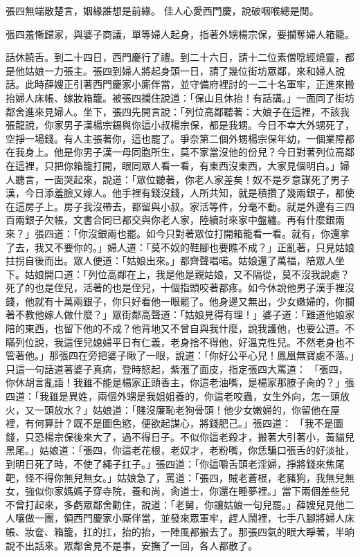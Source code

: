 \begin{showcontents}{}
張四無端散楚言，姻緣誰想是前緣。
佳人心愛西門慶，說破咽喉總是閒。

張四羞慚歸家，與婆子商議，單等婦人起身，指著外甥楊宗保，要攔奪婦人箱籠。

話休饒舌。到二十四日，西門慶行了禮。到二十六日，請十二位素僧唸經燒靈，都是他姑娘一力張主。張四到婦人將起身頭一日，請了幾位街坊眾鄰，來和婦人說話。此時薛嫂正引著西門慶家小廝伴當，並守備府裡討的一二十名軍牢，正進來搬抬婦人床帳、嫁妝箱籠。被張四攔住說道：「保山且休抬！有話講。」一面同了街坊鄰舍進來見婦人。坐下，張四先開言說：「列位高鄰聽著：大娘子在這裡，不該我張龍說，你家男子漢楊宗錫與你這小叔楊宗保，都是我甥。今日不幸大外甥死了，空掙一場錢。有人主張著你，這也罷了。爭奈第二個外甥楊宗保年幼，一個業障都在我身上。他是你男子漢一母同胞所生，莫不家當沒他的份兒？今日對著列位高鄰在這裡，只把你箱籠打開，眼同眾人看一看，有東西沒東西，大家見個明白。」婦人聽言，一面哭起來，說道：「眾位聽著，你老人家差矣！奴不是歹意謀死了男子漢，今日添羞臉又嫁人。他手裡有錢沒錢，人所共知，就是積攢了幾兩銀子，都使在這房子上。房子我沒帶去，都留與小叔。家活等件，分毫不動。就是外邊有三四百兩銀子欠帳，文書合同已都交與你老人家，陸續討來家中盤纏。再有什麼銀兩來？」張四道：「你沒銀兩也罷。如今只對著眾位打開箱籠看一看。就有，你還拿了去，我又不要你的。」婦人道：「莫不奴的鞋腳也要瞧不成？」正亂著，只見姑娘拄拐自後而出。眾人便道：「姑娘出來。」都齊聲唱喏。姑娘還了萬福，陪眾人坐下。姑娘開口道：「列位高鄰在上，我是他是親姑娘，又不隔從，莫不沒我說處？死了的也是侄兒，活著的也是侄兒，十個指頭咬著都疼。如今休說他男子漢手裡沒錢，他就有十萬兩銀子，你只好看他一眼罷了。他身邊又無出，少女嫩婦的，你攔著不教他嫁人做什麼？」眾街鄰高聲道：「姑娘見得有理！」婆子道：「難道他娘家陪的東西，也留下他的不成？他背地又不曾自與我什麼，說我護他，也要公道。不瞞列位說，我這侄兒媳婦平日有仁義，老身捨不得他，好溫克性兒。不然老身也不管著他。」那張四在旁把婆子瞅了一眼，說道：「你好公平心兒！鳳凰無寶處不落。」只這一句話道著婆子真病，登時怒起，紫漲了面皮，指定張四大罵道： 「張四，你休胡言亂語！我雖不能是楊家正頭香主，你這老油嘴，是楊家那膫子肏的？」張四道：「我雖是異姓，兩個外甥是我姐姐養的，你這老咬蟲，女生外向，怎一頭放火，又一頭放水？」姑娘道：「賤沒廉恥老狗骨頭！他少女嫩婦的，你留他在屋裡，有何算計？既不是圖色慾，便欲起謀心，將錢肥己。」張四道： 「我不是圖錢，只恐楊宗保後來大了，過不得日子。不似你這老殺才，搬著大引著小，黃貓兒黑尾。」姑娘道：「張四，你這老花根，老奴才，老粉嘴，你恁騙口張舌的好淡扯，到明日死了時，不使了繩子扛子。」張四道：「你這嚼舌頭老淫婦，掙將錢來焦尾靶，怪不得你無兒無女。」姑娘急了，罵道：「張四，賊老蒼根，老豬狗，我無兒無女，強似你家媽媽子穿寺院，養和尚，肏道士，你還在睡夢裡。」當下兩個差些兒不曾打起來，多虧眾鄰舍勸住，說道：「老舅，你讓姑娘一句兒罷。」薛嫂兒見他二人嚷做一團，領西門慶家小廝伴當，並發來眾軍牢，趕人鬧裡，七手八腳將婦人床帳、妝奩、箱籠，扛的扛，抬的抬，一陣風都搬去了。那張四氣的眼大睜著，半晌說不出話來。眾鄰舍見不是事，安撫了一回，各人都散了。


\end{showcontents}
